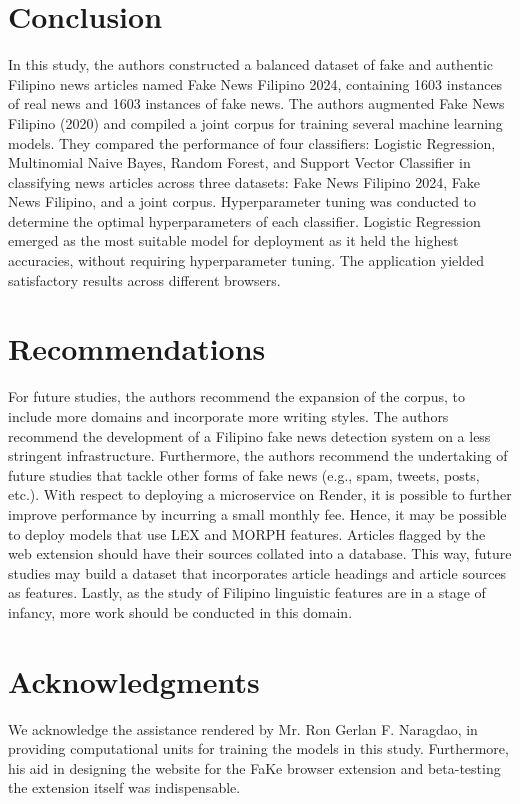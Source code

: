 \documentclass[conference]{IEEEtran}
\begin{document}
\section{Conclusion}

In this study, the authors constructed a balanced dataset of fake and authentic Filipino news articles named Fake News Filipino 2024, containing 1603 instances of real news and 1603 instances of fake news. The authors augmented Fake News Filipino (2020) and compiled a joint corpus for training several machine learning models. They compared the performance of four classifiers: Logistic Regression, Multinomial Naive Bayes, Random Forest, and Support Vector Classifier in classifying news articles across three datasets: Fake News Filipino 2024, Fake News Filipino, and a joint corpus. Hyperparameter tuning was conducted to determine the optimal hyperparameters of each classifier. Logistic Regression emerged as the most suitable model for deployment as it held the highest accuracies, without requiring hyperparameter tuning. The application yielded satisfactory results across different browsers.

\section{Recommendations}

For future studies, the authors recommend the expansion of the corpus, to include more domains and incorporate more writing styles. The authors recommend the development of a Filipino fake news detection system on a less stringent infrastructure. Furthermore, the authors recommend the undertaking of future studies that tackle other forms of fake news (e.g., spam, tweets, posts, etc.). With respect to deploying a microservice on Render, it is possible to further improve performance by incurring a small monthly fee. Hence, it may be possible to deploy models that use LEX and MORPH features. Articles flagged by the web extension should have their sources collated into a database. This way, future studies may build a dataset that incorporates article headings and article sources as features. Lastly, as the study of Filipino linguistic features are in a stage of infancy, more work should be conducted in this domain.  

\section*{Acknowledgments}

We acknowledge the assistance rendered by Mr. Ron Gerlan F. Naragdao, in providing computational units for training the models in this study. Furthermore, his aid in designing the website for the FaKe browser extension and beta-testing the extension itself was indispensable.
\end{document}

